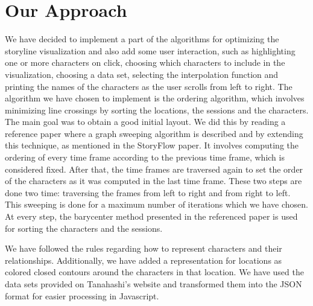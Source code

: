 \documentclass{report}
\begin{document}
\chapter{Our Approach}
\par
We have decided to implement a part of the algorithms for optimizing the storyline visualization and also add some user interaction, such as highlighting one or more characters on click, choosing which characters to include in the visualization, choosing a data set, selecting the interpolation function and printing the names of the characters as the user scrolls from left to right. The algorithm we have chosen to implement is the ordering algorithm, which involves minimizing line crossings by sorting the locations, the sessions and the characters. The main goal was to obtain a good initial layout. We did this by reading a reference paper \cite{4308636} where a graph sweeping algorithm is described and by extending this technique, as mentioned in the StoryFlow paper. It involves computing the ordering of every time frame according to the previous time frame, which is considered fixed. After that, the time frames are traversed again to set the order of the characters as it was computed in the last time frame. These two steps are done two time: traversing the frames from left to right and from right to left. This sweeping is done for a maximum number of iterations which we have chosen. At every step, the barycenter method presented in the referenced paper is used for sorting the characters and the sessions.
\par
We have followed the rules regarding how to represent characters and their relationships. Additionally, we have added a representation for locations as colored closed contours around the characters in that location. We have used the data sets provided on Tanahashi's website \cite{website:tanahashi} and transformed them into the JSON format for easier processing in Javascript.
\end{document}
